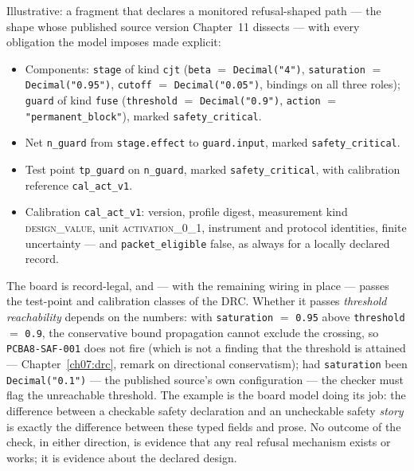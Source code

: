 \begin{example}
\label{ch05:ex:safety}
Illustrative: a fragment that declares a monitored refusal-shaped path
--- the shape whose published source version Chapter~11 dissects ---
with every obligation the model imposes made explicit:

\begin{itemize}
\item Components: \texttt{stage} of kind \texttt{cjt}
(\texttt{beta} $=$ \texttt{Decimal("4")}, \texttt{saturation} $=$
\texttt{Decimal("0.95")}, \texttt{cutoff} $=$ \texttt{Decimal("0.05")},
bindings on all three roles); \texttt{guard} of kind \texttt{fuse}
(\texttt{threshold} $=$ \texttt{Decimal("0.9")}, \texttt{action} $=$
\texttt{"permanent\_block"}), marked \texttt{safety\_critical}.
\item Net \texttt{n\_guard} from \texttt{stage.effect} to
\texttt{guard.input}, marked \texttt{safety\_critical}.
\item Test point \texttt{tp\_guard} on \texttt{n\_guard}, marked
\texttt{safety\_critical}, with calibration reference
\texttt{cal\_act\_v1}.
\item Calibration \texttt{cal\_act\_v1}: version, profile digest,
measurement kind \textsc{design\_value}, unit
\textsc{activation\_0\_1}, instrument and protocol identities, finite
uncertainty --- and \texttt{packet\_eligible} false, as always for a
locally declared record.
\end{itemize}

The board is record-legal, and --- with the remaining wiring in place
--- passes the test-point and calibration classes of the DRC. Whether
it passes \emph{threshold reachability} depends on the numbers: with
\texttt{saturation} $=$ \texttt{0.95} above \texttt{threshold} $=$
\texttt{0.9}, the conservative bound propagation cannot exclude the crossing, so
\texttt{PCBA8-SAF-001} does not fire (which is not a finding that the
threshold is attained --- Chapter~\ref{ch07:drc}, remark on directional
conservatism); had \texttt{saturation} been
\texttt{Decimal("0.1")} --- the published source's own configuration
--- the checker must flag the unreachable threshold. The example is the
board model doing its job: the difference between a checkable safety
declaration and an uncheckable safety \emph{story} is exactly the
difference between these typed fields and prose. No outcome of the
check, in either direction, is evidence that any real refusal
mechanism exists or works; it is evidence about the declared design.
\end{example}

